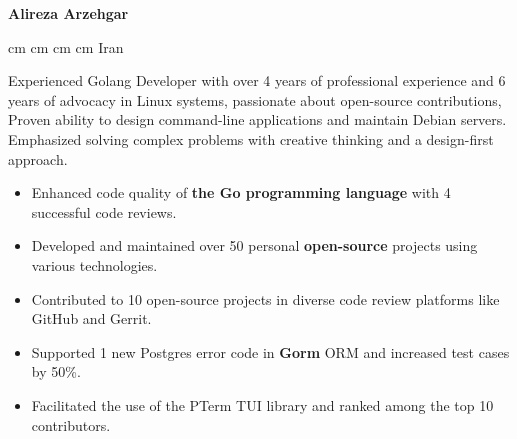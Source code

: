 \documentclass{engineercv}
\begin{document}
\begin{center}
  \textbf{\fontsize{24 pt}{24 pt}\selectfont Alireza Arzehgar}

  \vspace{0.2 cm}

  \scriptsize
  \mbox{}
   cm
  \mbox{}
   cm
  \mbox{}
   cm
  \mbox{}
   cm
  \mbox{{\color{black}\footnotesize\faMapMarker*}\hspace*{0.13cm}Iran}
\end{center}


Experienced Golang Developer with over 4 years of professional experience and 6 years of advocacy in Linux systems,
passionate about open-source contributions, Proven ability to design command-line applications and
maintain Debian servers. Emphasized solving complex problems with creative thinking
and a design-first approach.

\begin{itemize}
  \item Enhanced code quality of \textbf{the Go programming language} with 4 successful code reviews.
  \item Developed and maintained over 50 personal \textbf{open-source} projects using various technologies.
  \item Contributed to 10 open-source projects in diverse code review platforms like GitHub and Gerrit.
  \item Supported 1 new Postgres error code in \textbf{Gorm} ORM and increased test cases by 50\%.
  \item Facilitated the use of the PTerm TUI library and ranked among the top 10 contributors.
\end{itemize}

\end{document}
